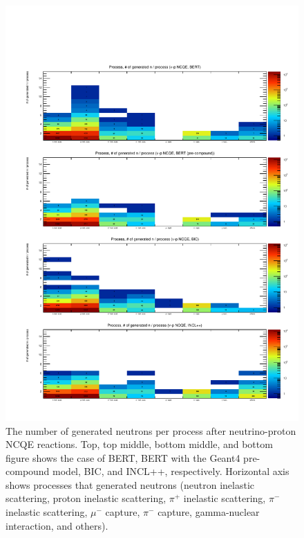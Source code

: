 \begin{figure}[H]
	\centering
	\includegraphics[width=15cm]{PDF/Secondary/Comparison_PreCompound/neutron/pdf2/Logz_Pro_NumSec_nuncqe_p}
	\caption[The number of generated neutrons per process after neutrino-proton NCQE reactions]{
	The number of generated neutrons per process after neutrino-proton NCQE reactions.
	Top, top middle, bottom middle, and bottom figure shows the case of BERT, BERT with the Geant4 pre-compound model, BIC, and INCL++, respectively.
	Horizontal axis shows processes that generated neutrons (neutron inelastic scattering, proton inelastic scattering, $\pi^{+}$ inelastic scattering, $\pi^{-}$ inelastic scattering, $\mu^{-}$ capture, $\pi^{-}$ capture, gamma-nuclear interaction, and others).
	}\label{Others_neutron_Logz_Pro_NumSec_nuncqe_p}
\end{figure}

